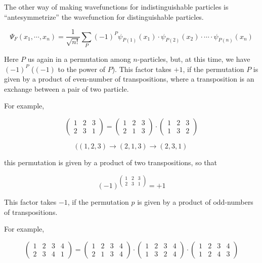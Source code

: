 The other way of making wavefunctions for indistinguishable particles is ``antesymmetrize'' the wavefunction for distinguishable particles. %

\[\Psi_F(x_1,\cdots,x_n) = \frac{1}{\sqrt{n!}}\sum_P(-1)^P\psi_{P(1)}(x_1)\cdot\psi_{P(2)}(x_2)\cdot\cdots\cdot\psi_{P(n)}(x_n) \]

Here $P$ us again in a permutation among $n$-particles, but, at this time, we have $(-1)^P$ ($(-1)$ to the power of $P$). This factor takes $+1$, if the permutation $P$ is given by a product of even-number of transpositions, where a transposition is an exchange between a pair of two particle. 

For example, 

\[
\left(\begin{matrix}
1 & 2 & 3\\ 2 & 3 & 1
\end{matrix}\right) = 
\left(\begin{matrix}
1 & 2 & 3\\ 2 & 1 & 3
\end{matrix}\right)
\cdot
\left(\begin{matrix}
1 & 2 & 3\\ 1 & 3 & 2
\end{matrix}\right)
\]

\[((1,2,3)\rightarrow(2,1,3)\rightarrow(2,3,1) \]

this permutation is given by a product of two transpositions, so that

\[(-1)^{\left(\begin{matrix}
1 & 2 & 3\\ 2 & 3 & 1
\end{matrix}\right)} = +1 \]

This factor takes $-1$, if the permutation $p$ is given by a product of odd-numbers of transpositions. 

For example, 

\[
\left(\begin{matrix}
1 & 2 & 3 & 4\\ 2 & 3 & 4 & 1
\end{matrix}\right)=
\left(\begin{matrix}
1 & 2 & 3 & 4\\ 2 & 1 & 3 & 4
\end{matrix}\right)
\cdot
\left(\begin{matrix}
1 & 2 & 3 & 4\\ 1 & 3 & 2 & 4
\end{matrix}\right)
\cdot
\left(\begin{matrix}
1 & 2 & 3 & 4\\ 1 & 2 & 4 & 3
\end{matrix}\right)
\]

